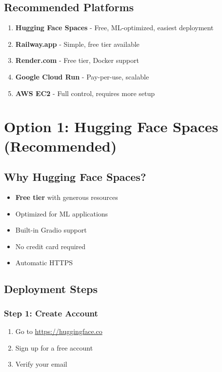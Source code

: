 \documentclass[11pt,a4paper]{article}
\begin{document}
\subsection{Recommended Platforms}

\begin{enumerate}
    \item \textbf{Hugging Face Spaces} - Free, ML-optimized, easiest deployment
    \item \textbf{Railway.app} - Simple, free tier available
    \item \textbf{Render.com} - Free tier, Docker support
    \item \textbf{Google Cloud Run} - Pay-per-use, scalable
    \item \textbf{AWS EC2} - Full control, requires more setup
\end{enumerate}

\section{Option 1: Hugging Face Spaces (Recommended)}

\subsection{Why Hugging Face Spaces?}
\begin{itemize}
    \item \textbf{Free tier} with generous resources
    \item Optimized for ML applications
    \item Built-in Gradio support
    \item No credit card required
    \item Automatic HTTPS
\end{itemize}

\subsection{Deployment Steps}

\subsubsection{Step 1: Create Account}
\begin{enumerate}
    \item Go to \url{https://huggingface.co}
    \item Sign up for a free account
    \item Verify your email
\end{enumerate}
\end{document}
